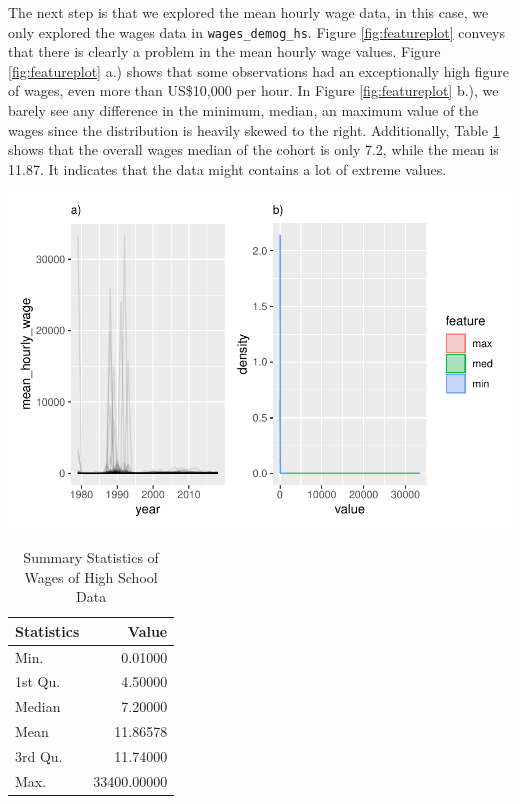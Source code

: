 \documentclass{article}
\begin{document}
The next step is that we explored the mean hourly wage data, in this
case, we only explored the wages data in \texttt{wages\_demog\_hs}.
Figure \ref{fig:featureplot} conveys that there is clearly a problem in
the mean hourly wage values. Figure \ref{fig:featureplot} a.) shows that
some observations had an exceptionally high figure of wages, even more
than US\$10,000 per hour. In Figure \ref{fig:featureplot} b.), we barely
see any difference in the minimum, median, an maximum value of the wages
since the distribution is heavily skewed to the right. Additionally,
Table \ref{tab:summarytable} shows that the overall wages median of the
cohort is only 7.2, while the mean is 11.87. It indicates that the data
might contains a lot of extreme values.

\includegraphics{report_files/figure-latex/featureplot-1.pdf}

\begin{table}

\caption{\label{tab:summarytable}Summary Statistics of Wages of High School Data}
\centering
\begin{tabular}[t]{l|r}
\hline
Statistics & Value\\
\hline
\rowcolor{gray!6}  Min. & 0.01000\\
\hline
1st Qu. & 4.50000\\
\hline
\rowcolor{gray!6}  Median & 7.20000\\
\hline
Mean & 11.86578\\
\hline
\rowcolor{gray!6}  3rd Qu. & 11.74000\\
\hline
Max. & 33400.00000\\
\hline
\end{tabular}
\end{table}
\end{document}

